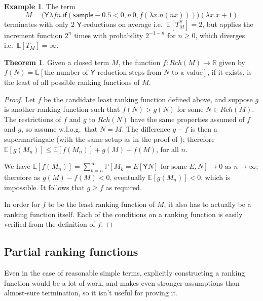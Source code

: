 \documentclass{article}
\newcommand\expect[1]{\mathbb{E}[#1]}
\newcommand{\tY}{\mathsf{Y}}
\newcommand{\tif}[3]{\mathsf{if}(#1, #2, #3)} %
\newcommand{\tsample}{\mathsf{sample}}
\theoremstyle{definition}
\newtheorem{example}{Example}
\theoremstyle{lemma}
\newtheorem{theorem}{Theorem}
\theoremstyle{remark}
\begin{document}
\begin{example}
\label{ex:tY finite does not imply t finite}
The term
\[
M = \big(\tY \lambda f n. \tif{\tsample - 0.5 < 0}{n \, \underline 0}{f (\lambda x. n (n x))}\big) (\lambda x. x+1)
\] 
terminates with only 2 $\tY$-reductions on average i.e.~$\expect{T_M^\tY} = 2$, but applies the increment function $2^n$ times with probability $2^{-1-n}$ for $n \geq 0$, which diverges i.e.~$\expect{T_M} = \infty$.
\end{example}

\begin{theorem} \label{thm:minimal}
Given a closed term $M$, the function $f:Rch(M) \to \mathbb R$ given by $f(N) = \mathbb E [\text{the number of }\tY\text{-reduction steps from }N\text{ to a value}]$, if it exists, is the least of all possible ranking functions of $M$.
\end{theorem}
\begin{proof}
Let $f$ be the candidate least ranking function defined above, and suppose $g$ is another ranking function such that $f(N) > g(N)$ for some $N \in Rch(M)$. The restrictions of $f$ and $g$ to $Rch(N)$ have the same properties assumed of $f$ and $g$, so assume w.l.o.g.~that $N=M$. The difference $g - f$ is then a supermartingale (with the same setup as in the proof of %
);
therefore $\mathbb E[g(M_n)] \leq \mathbb E[f(M_n)] + g(M)-f(M)$, for all $n$.

We have $\mathbb E[f(M_n)] = \sum_{k=n}^\infty \mathbb P[M_k = E[\tY N] \text{ for some }E, N] \to 0 \text{ as } n \to \infty$; 
therefore as $g(M) - f(M) < 0$, eventually $\mathbb E[g(M_n)] < 0$, which is impossible. 
It follows that $g \geq f$ as required.

In order for $f$ to be the least ranking function of $M$, it also has to actually be a ranking function itself. Each of the conditions on a ranking function is easily verified from the definition of $f$.
\end{proof}

\subsection{Partial ranking functions}
Even in the case of reasonable simple terms, explicitly constructing a ranking function would be a lot of work, and  makes even stronger assumptions than almost-sure termination, so it isn't useful for proving it.
\end{document}
